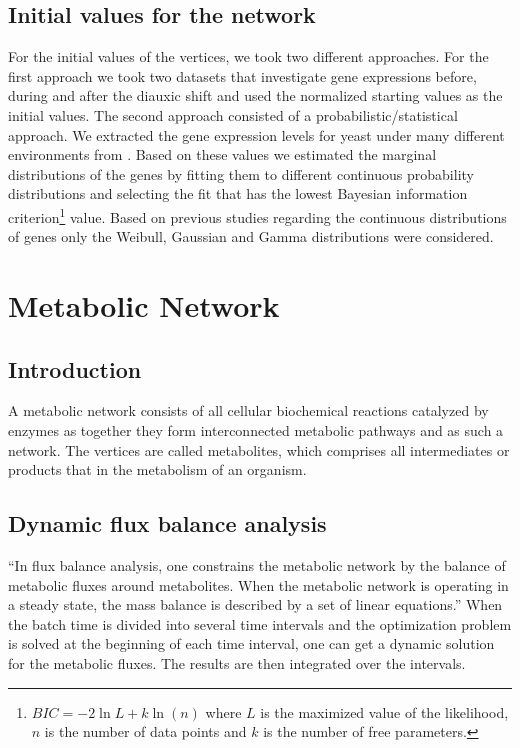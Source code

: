 \subsection{Initial values for the network}
For the initial values of the vertices, we took two different approaches. For the first approach we took two datasets\cite{brauer2008coordination,brauer2005homeostatic} that investigate gene expressions before, during and after
the diauxic shift and used the normalized starting values as the initial values. The second approach consisted of a probabilistic/statistical approach. We  extracted the gene expression levels
for yeast under many different environments from \cite{faith2008many}. Based on these values we estimated the marginal distributions of the genes by fitting them to different continuous probability distributions and selecting the fit that has the lowest
Bayesian information criterion\footnote{$BIC = -2 \ln L + k \ln(n)$ where $L$ is the maximized value of the likelihood,
$n$ is the number of data points and $k$ is the number of free parameters.} value. Based on previous studies 
regarding the continuous distributions of genes \cite{NEEDED} only the Weibull, Gaussian and Gamma distributions were
considered. 
\section{Metabolic Network}
\subsection{Introduction}
A metabolic network consists of all cellular biochemical reactions catalyzed by enzymes as together they form interconnected metabolic pathways
and as such a network. The vertices are called metabolites, which comprises all intermediates or products that in the metabolism of an organism.
\subsection{Dynamic flux balance analysis}
``In flux balance analysis, one constrains the metabolic network by the balance of metabolic fluxes around metabolites. 
When the metabolic network is operating in a steady state, the mass balance is described by a set of linear equations.''
\cite{mahadevan2002dynamic}
When the batch time is divided into several time intervals and the optimization problem is solved at the beginning of 
each time interval, one can get a dynamic solution for the metabolic fluxes. The results are then integrated over the intervals.
